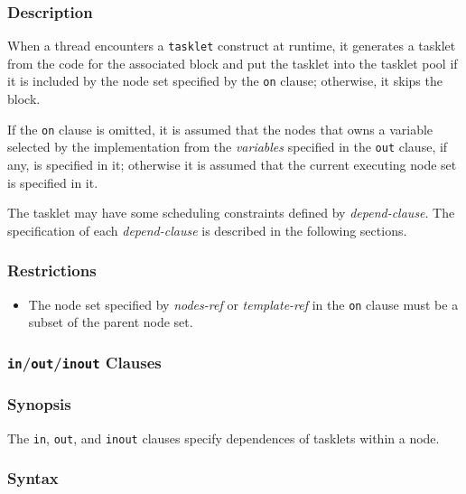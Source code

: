 \subsubsection*{Description}

When a thread encounters a {\tt tasklet} construct at runtime, it
generates a tasklet from the code for the associated block and put the
tasklet into the tasklet pool if it is included by the node set
specified by the {\tt on} clause; otherwise, it skips the block.

If the {\tt on} clause is omitted, it is assumed that the nodes that
owns a variable selected by the implementation from the {\it variables}
specified in the \verb|out| clause, if any, is specified in it;
otherwise it is assumed that the current executing node set is specified
in it.

The tasklet may have some scheduling constraints defined by {\it
depend-clause}. The specification of each {\it depend-clause} is
described in the following sections.

\subsubsection*{Restrictions}

\begin{itemize}
  \item The node set specified by {\it nodes-ref} or {\it template-ref}
		in the {\tt on} clause must be a subset of the parent node set.
\end{itemize}


%
%

\subsubsection{{\tt in}/{\tt out}/{\tt inout} Clauses}

\subsubsection*{Synopsis}

The \verb|in|, \verb|out|, and \verb|inout| clauses specify dependences
of tasklets within a node.

\subsubsection*{Syntax}

